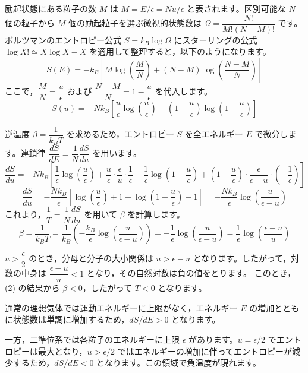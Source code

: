 \solutionheading
\begin{solutionparts}

励起状態にある粒子の数 $M$ は $M = E/\epsilon = Nu/\epsilon$ と表されます。区別可能な $N$ 個の粒子から $M$ 個の励起粒子を選ぶ微視的状態数は $\Omega = \dfrac{N!}{M!(N-M)!}$ です。 ボルツマンのエントロピー公式 $S = k_B \log \Omega$ にスターリングの公式 $\log X! \simeq X \log X - X$ を適用して整理すると，以下のようになります。
\begin{equation*}
S(E) = -k_B \left[ M \log \left(\frac{M}{N}\right) + (N-M) \log \left(\frac{N-M}{N}\right) \right]
\end{equation*}
ここで，$\dfrac{M}{N} = \dfrac{u}{\epsilon}$ および $\dfrac{N-M}{N} = 1 - \dfrac{u}{\epsilon}$ を代入します。
\begin{equation*}
S(u) = -N k_B \left[ \frac{u}{\epsilon} \log \left(\frac{u}{\epsilon}\right) + \left(1 - \frac{u}{\epsilon}\right) \log \left(1 - \frac{u}{\epsilon}\right) \right]
\end{equation*}

逆温度 $\beta = \dfrac{1}{k_B T}$ を求めるため，エントロピー $S$ を全エネルギー $E$ で微分します。連鎖律 $\dfrac{dS}{dE} = \dfrac{1}{N} \dfrac{dS}{du}$ を用います。
\begin{equation*}
\frac{dS}{du} = -N k_B \left[ \frac{1}{\epsilon} \log \left(\frac{u}{\epsilon}\right) + \frac{u}{\epsilon} \cdot \frac{\epsilon}{u} \cdot \frac{1}{\epsilon} - \frac{1}{\epsilon} \log \left(1 - \frac{u}{\epsilon}\right) + \left(1 - \frac{u}{\epsilon}\right) \cdot \frac{\epsilon}{\epsilon - u} \cdot \left(-\frac{1}{\epsilon}\right) \right]
\end{equation*}
\begin{equation*}
\frac{dS}{du} = -\frac{N k_B}{\epsilon} \left[ \log \left(\frac{u}{\epsilon}\right) + 1 - \log \left(1 - \frac{u}{\epsilon}\right) - 1 \right] = -\frac{N k_B}{\epsilon} \log \left( \frac{u}{\epsilon - u} \right)
\end{equation*}
これより，$\dfrac{1}{T} = \dfrac{1}{N} \dfrac{dS}{du}$ を用いて $\beta$ を計算します。
\begin{equation*}
\beta = \frac{1}{k_B T} = \frac{1}{k_B} \left( -\frac{k_B}{\epsilon} \log \left( \frac{u}{\epsilon - u} \right) \right) = -\frac{1}{\epsilon} \log \left( \frac{u}{\epsilon - u} \right) = \frac{1}{\epsilon} \log \left( \frac{\epsilon - u}{u} \right)
\end{equation*}

$u > \dfrac{\epsilon}{2}$ のとき，分母と分子の大小関係は $u > \epsilon - u$ となります。したがって，対数の中身は $\dfrac{\epsilon - u}{u} < 1$ となり，その自然対数は負の値をとります。 このとき，(2) の結果から $\beta < 0$，したがって $T < 0$ となります。
\par
通常の理想気体では運動エネルギーに上限がなく，エネルギー $E$ の増加とともに状態数は単調に増加するため，$dS/dE>0$ となります。
\par
一方，二準位系では各粒子のエネルギーに上限 $\epsilon$ があります。$u=\epsilon/2$ でエントロピーは最大となり，$u>\epsilon/2$ ではエネルギーの増加に伴ってエントロピーが減少するため，$dS/dE<0$ となります。この領域で負温度が現れます。

\end{solutionparts}
